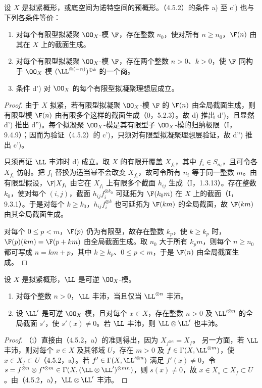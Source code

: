 设 $X$ 是拟紧概形，或底空间为诺特空间的预概形。（4.5.2）的条件 \textup{a)} 至 \textup{c')} 也与下列各条件等价：
\begin{enumerate}[label=\textup{d)}]
\item 对每个有限型拟凝聚 $\OO_X$-模 $\F$，存在整数 $n_0$，使对所有 $n\geq n_0$，$\F(n)$ 由其在 $X$ 上的截面生成。
\item[\textup{d')}] 对每个有限型拟凝聚 $\OO_X$-模 $\F$，存在两个整数 $n>0$、$k>0$，使 $\F$ 同构于 $\OO_X$-模 $(\LL^{\otimes(-n)})^{\oplus k}$ 的一个商。
\item[\textup{d'')}] 条件 \textup{d')} 对 $\OO_X$ 的每个有限型拟凝聚理想层成立。
\end{enumerate}
\begin{proof}
由于 $X$ 拟紧，若有限型拟凝聚 $\OO_X$-模 $\F$ 的 $\F(n)$ 由全局截面生成，则有限型模 $\F(n)$ 由有限多个这样的截面生成（0，5.2.3）。故 d) 推出 d')，且显然 d') 推出 d'')。每个拟凝聚 $\OO_X$-模是其有限型子 $\OO_X$-模的归纳极限（I，9.4.9）；因而为验证（4.5.2）的 c')，只须对有限型拟凝聚理想层验证，故 d'') 推出 c')。

只须再证 $\LL$ 丰沛时 d) 成立。取 $X$ 的有限开覆盖 $X_{f_i}$，其中 $f_i\in S_{n_i}$，且可令各 $X_{f_i}$ 仿射。把 $f_i$ 替换为适当幂不会改变 $X_{f_i}$，故可令所有 $n_i$ 等于同一整数 $m$。由有限型假设，$\F|X_{f_i}$ 由它在 $X_{f_i}$ 上有限多个截面 $h_{ij}$ 生成（I，1.3.13）。存在整数 $k_0$，使对每个 $(i,j)$，截面 $h_{ij}f_i^{\otimes k_0}$ 可延拓为 $\F(k_0m)$ 在 $X$ 上的截面（I，9.3.1）。于是对每个 $k\geq k_0$，$h_{ij}f_i^{\otimes k}$ 也可延拓为 $\F(km)$ 的全局截面，故 $\F(km)$ 由其全局截面生成。

对每个 $0\leq p<m$，$\F(p)$ 仍为有限型，故存在整数 $k_p$，使 $k\geq k_p$ 时，$\F(p)(km)=\F(p+km)$ 由全局截面生成。取 $n_0$ 大于所有 $k_pm$，则每个 $n\geq n_0$ 都可写成 $n=km+p$，其中 $k\geq k_p$、$0\leq p<m$，于是 $\F(n)$ 由全局截面生成。
\end{proof}

设 $X$ 是拟紧概形，$\LL$ 是可逆 $\OO_X$-模。
\begin{enumerate}[label=\textup{(\roman*)}]
\item 对每个整数 $n>0$，$\LL$ 丰沛，当且仅当 $\LL^{\otimes n}$ 丰沛。
\item 设 $\LL'$ 是可逆 $\OO_X$-模，且对每个 $x\in X$，存在整数 $n>0$ 及 $\LL'^{\otimes n}$ 的全局截面 $s'$，使 $s'(x)\ne0$。若 $\LL$ 丰沛，则 $\LL\otimes\LL'$ 也丰沛。
\end{enumerate}
\begin{proof}
（i）直接由（4.5.2，a）的准则得出，因为 $X_{f^{\otimes n}}=X_f$。
另一方面，若 $\LL$ 丰沛，则对每个 $x\in X$ 及其邻域 $U$，存在 $m>0$ 及 $f\in\Gamma(X,\LL^{\otimes m})$，使 $x\in X_f\subset U$（4.5.2，a）。若 $f'\in\Gamma(X,\LL'^{\otimes n})$ 满足 $f'(x)\ne0$，令
$s=f^{\otimes n}\otimes f'^{\otimes m}\in\Gamma(X,(\LL\otimes\LL')^{\otimes mn})$，则 $s(x)\ne0$，故 $x\in X_s\subset X_f\subset U$。由（4.5.2，a），$\LL\otimes\LL'$ 丰沛。
\end{proof}

